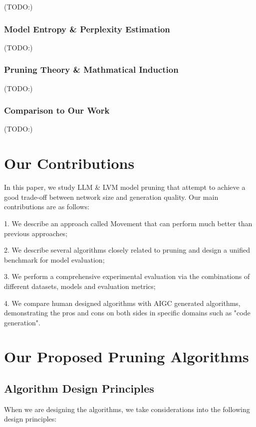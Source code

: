 \documentclass{article} %
\begin{document}
(TODO:)

\subsubsection{Model Entropy \& Perplexity Estimation}

(TODO:)

\subsubsection{Pruning Theory \& Mathmatical Induction}

(TODO:)

\subsubsection{Comparison to Our Work}

(TODO:)

\section{Our Contributions}
\label{headings}

In this paper, we study LLM \& LVM model pruning that attempt to achieve a good trade-off between network size and generation quality. Our main contributions are as follows:

1. We describe an approach called Movement that can perform much better than previous approaches;

2. We describe several algorithms closely related to pruning and design a unified benchmark for model evaluation;

3. We perform a comprehensive experimental evaluation via the combinations of different datasets, models and evaluation metrics;

4. We compare human designed algorithms with AIGC generated algorithms, demonstrating the pros and cons on both sides in specific domains such as "code generation".

\section{Our Proposed Pruning Algorithms}
\label{ours}
\subsection{Algorithm Design Principles}
When we are designing the algorithms, we take considerations into the following design principles:
\end{document}

